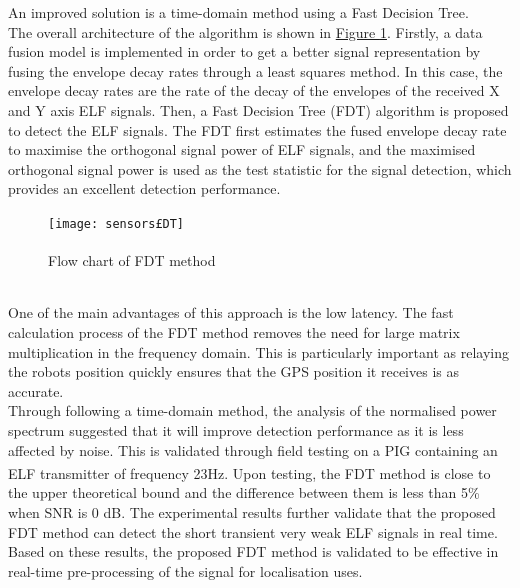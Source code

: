 \documentclass[11pt]{article}		%
\newcommand{\supercite}[1]{\textsuperscript{\cite{#1}}}		%
\newcommand{\figref}[1]{\hyperref[#1]{Figure \ref*{#1}}}    %
\begin{document}
		    \begin{floatingfigure}[r]{0pt} \end{floatingfigure}
			An improved solution is a time-domain method using a Fast Decision Tree. 
			\\
	    	\hspace*{2ex}The overall architecture of the algorithm is shown in \figref{FDTFlowchart}. 
	    	Firstly, a data fusion model is implemented in order to get a better signal representation by fusing the envelope decay rates through a least squares method. 
	    	In this case, the envelope decay rates are the rate of the decay of the envelopes of the received X and Y axis ELF signals. 
	    	Then, a Fast Decision Tree (FDT) algorithm is proposed to detect the ELF signals. 
	    	The FDT first estimates the fused envelope decay rate to maximise the orthogonal signal power of ELF signals, and the maximised orthogonal signal power is used as the test statistic for the signal detection, which provides an excellent detection performance.
	         \begin{figure}[h]
				\centering
				\texttt{[image: sensors£DT]}
				\caption{Flow chart of FDT method\supercite{FDT}}
				\label{FDTFlowchart}
			\end{figure}
			\\
            \hspace*{2ex}One of the main advantages of this approach is the low latency. 
			The fast calculation process of the FDT method removes the need for large matrix multiplication in the frequency domain. 
			This is particularly important as relaying the robots position quickly ensures that the GPS position it receives is as accurate. 
			\\
	    	\hspace*{2ex}Through following a time-domain method, the analysis of the normalised power spectrum suggested that it will improve detection performance as it is less affected by noise. 
	    	This is validated through field testing on a PIG containing an ELF transmitter of frequency 23Hz\supercite{FDT}. 
	    	Upon testing, the FDT method is close to the upper theoretical bound and the difference between them is less than 5\% when SNR is 0 dB.
	    	The experimental results further validate that the proposed FDT method can detect the short transient very weak ELF signals in real time. 
	    	Based on these results, the proposed FDT method is validated to be effective in real-time pre-processing of the signal for localisation uses.
			
\end{document}
